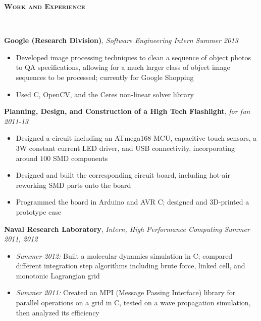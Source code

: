 \documentclass{article}
\newenvironment{changemargin}[2]{%
  \begin{list}{}{%
    \setlength{\topsep}{0pt}%
    \setlength{\leftmargin}{#1}%
    \setlength{\rightmargin}{#2}%
    \setlength{\listparindent}{\parindent}%
    \setlength{\itemindent}{\parindent}%
    \setlength{\parsep}{\parskip}%
  }%
  \item[]}{\end{list}
}
\newcommand{\lineover}{
	\begin{changemargin}{-0.05in}{-0.05in}
		\vspace*{-8pt}
		\hrulefill \\
		\vspace*{-2pt}
	\end{changemargin}
}
\newcommand{\header}[1]{
	\begin{changemargin}{-0.5in}{-0.5in}
		{\large \textbf{\scshape{#1}}}\\
  	\lineover
	\end{changemargin}
}
\newenvironment{body} {
	\vspace*{-16pt}
	\begin{changemargin}{-0.25in}{-0.5in}
  }	
	{\end{changemargin}
}
\newcommand{\CC}{C\nolinebreak\hspace{-.05em}\raisebox{.4ex}{\tiny\bf +}\nolinebreak\hspace{-.10em}\raisebox{.4ex}{\tiny\bf +}}
\begin{document}
\smallskip


\header{Work and Experience}

\begin{body}
	\vspace{14pt}
	\textbf{Google (Research Division)}, \emph{Software Engineering Intern} \hfill \emph{Summer 2013}\\
	\vspace*{-4pt}
	\begin{itemize}
		\item Developed image processing techniques to clean a sequence of object photos to QA specifications, allowing for a much larger class of object image sequences to be processed; currently for Google Shopping
		\item Used \CC, OpenCV, and the Ceres non-linear solver library
	\end{itemize}
	
	\medskip
	
	\textbf{Planning, Design, and Construction of a High Tech Flashlight}, \emph{for fun} \hfill \emph{2011-13}\\
	\vspace*{-4pt}
	\begin{itemize}
		\item Designed a circuit including an ATmega168 MCU, capacitive touch sensors, a 3W constant current LED driver, and USB connectivity, incorporating around $100$ SMD components
		\item Designed and built the corresponding circuit board, including hot-air reworking SMD parts onto the board
		\item Programmed the board in Arduino and AVR C; designed and 3D-printed a prototype case
	\end{itemize}

	\medskip

	\textbf{Naval Research Laboratory}, \emph{Intern, High Performance Computing} \hfill \emph{Summer 2011, 2012}\\
	\vspace*{-4pt}
	\begin{itemize}
		\item \emph{Summer 2012:} Built a molecular dynamics simulation in C; compared different integration step algorithms including brute force, linked cell, and monotonic Lagrangian grid
		\item \emph{Summer 2011:} Created an MPI (Message Passing Interface) library for parallel operations on a grid in \CC, tested on a wave propagation simulation, then analyzed its efficiency
	\end{itemize}
\end{body}
\end{document}
